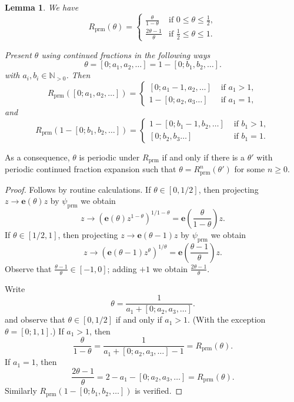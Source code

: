 \documentclass[]{amsart}
\newcommand\prm{{\operatorname{prm}}}
\newcommand\cRRc{R_{\prm}}%
\newcommand{\ee}{\mathbf e}
\newcommand{\N}{\mathbb{N}}
\newtheorem{lem}[thm]{Lemma}
\theoremstyle{remark}
\numberwithin{equation}{section}
\theoremstyle{definition}
\begin{document}
\begin{lem}
\label{lem:ActOfPrimRenorm}
We have 
\begin{equation}
\label{eq:R_prm}
\cRRc(\theta)  = \begin{cases} \frac{\theta}{1-\theta}& \mbox{if }0\le \theta \le \frac{1}{2}, \\
\frac{2\theta-1}{\theta} & \mbox{if }\frac{1}{2}\le \theta\le 1.
\end{cases}
\end{equation}



Present $\theta$ using continued fractions in the following ways
\[\theta=[0;a_1,a_2,\dots]= 1-[0;b_1,b_2,\dots].\]
with $a_i,b_i\in \N_{>0}$.
Then 
\[\cRRc([0;a_1,a_2,\dots])=\begin{cases}
[0;a_1-1,a_2,\dots]& \text{ if }a_1>1, \\
1 - [0;a_2,a_3\dots]& \text{ if }a_1=1,
\end{cases}\]
and 
\[\cRRc(1-[0;b_1,b_2,\dots])=\begin{cases}
1-[0;b_1-1,b_2,\dots]& \text{ if }b_1>1, \\
  [0;b_2,b_3\dots]& \text{ if }b_1=1.
\end{cases}\]
\end{lem}  
\noindent As a consequence, $\theta$ is periodic under $\cRRc$ if and only if there is a $\theta'$ with periodic continued fraction expansion such that $\theta=\cRRc^n(\theta')$ for some $n\ge 0$.
\begin{proof}
Follows by routine calculations. If $\theta\in [0,1/2]$, then projecting $z\to \ee(\theta) z$ by $\psi_\prm$ we obtain
\[z\to \left(\ee(\theta) z ^{1-\theta}\right)^{1/1-\theta}=\ee\left(\frac{\theta}{1-\theta}\right)z.\]
If $\theta\in [1/2,1]$, then projecting $z\to \ee(\theta-1) z$ by $\psi_\prm$ we obtain
\[z\to \left(\ee(\theta-1) z ^{\theta}\right)^{1/\theta}=\ee\left(\frac{\theta-1}{\theta}\right)z.\]
Observe that $\frac{\theta-1}{\theta}\in [-1,0]$; adding $+1$ we obtain  
$\frac{2\theta-1}{\theta}$.

Write \[\theta= \frac{1}{a_1+[0;a_2,a_3,\dots]}.\] and observe that $\theta \in [0,1/2]$ if and only if $a_1>1$. (With the exception $\theta=[0;1,1]$.) If $a_1>1$, then
\[\frac{\theta}{1-\theta}=\frac{1}{a_1+[0;a_2,a_3,\dots] -1}=\cRRc(\theta).\] If $a_1=1$, then
\[\frac{2\theta-1}{\theta}=2-a_1-[0;a_2,a_3,\dots] =\cRRc(\theta).\]
Similarly $\cRRc(1-[0;b_1,b_2,\dots])$ is verified.
\end{proof}
\end{document}
